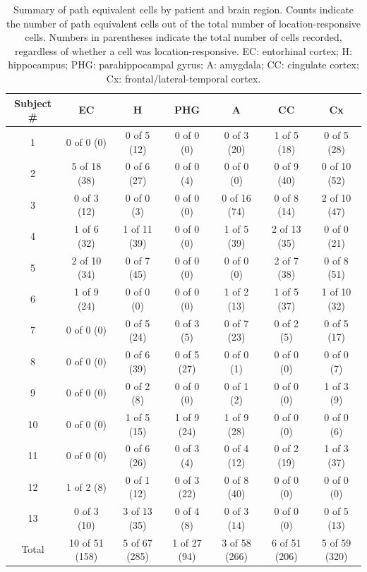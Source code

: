 \clearpage
\begin{table}
	\centering
	\small
\begin{tabular}{c|cccccc}
Subject \# & EC & H & PHG & A & CC & Cx\\\hline
1 &0 of 0 (0) &0 of 5 (12) &0 of 0 (0) &0 of 3 (20) &1 of 5 (18) &0 of 5 (28)\\
2 &5 of 18 (38) &0 of 6 (27) &0 of 0 (4) &0 of 0 (0) &0 of 9 (40) &0 of 10 (52)\\
3 &0 of 3 (12) &0 of 0 (3) &0 of 0 (0) &0 of 16 (74) &0 of 8 (14) &2 of 10 (47)\\
4 &1 of 6 (32) &1 of 11 (39) &0 of 0 (0) &1 of 5 (39) &2 of 13 (35) &0 of 0 (21)\\
5 &2 of 10 (34) &0 of 7 (45) &0 of 0 (0) &0 of 0 (0) &2 of 7 (38) &0 of 8 (51)\\
6 &1 of 9 (24) &0 of 0 (0) &0 of 0 (0) &1 of 2 (13) &1 of 5 (37) &1 of 10 (32)\\
7 &0 of 0 (0) &0 of 5 (24) &0 of 3 (5) &0 of 7 (23) &0 of 2 (5) &0 of 5 (17)\\
8 &0 of 0 (0) &0 of 6 (39) &0 of 5 (27) &0 of 0 (1) &0 of 0 (0) &0 of 0 (7)\\
9 &0 of 0 (0) &0 of 2 (8) &0 of 0 (0) &0 of 1 (2) &0 of 0 (0) &1 of 3 (9)\\
10 &0 of 0 (0) &1 of 5 (15) &1 of 9 (24) &1 of 9 (28) &0 of 0 (0) &0 of 0 (6)\\
11 &0 of 0 (0) &0 of 6 (26) &0 of 3 (4) &0 of 4 (12) &0 of 2 (19) &1 of 3 (37)\\
12 &1 of 2 (8) &0 of 1 (12) &0 of 3 (22) &0 of 8 (40) &0 of 0 (0) &0 of 0 (0)\\
13 &0 of 3 (10) &3 of 13 (35) &0 of 4 (8) &0 of 3 (14) &0 of 0 (0) &0 of 5 (13)\\
\hline Total &10 of 51 (158) &5 of 67 (285) &1 of 27 (94) &3 of 58 (266) &6 of 51 (206) &5 of 59 (320)\\
\end{tabular}
\caption[Summary of path equivalent cells]{Summary of path equivalent cells by patient and brain region. Counts indicate the number of path equivalent cells out of the total number of location-responsive cells. Numbers in parentheses indicate the total number of cells recorded, regardless of whether a cell was location-responsive. EC: entorhinal cortex; H: hippocampus; PHG: parahippocampal gyrus; A: amygdala; CC: cingulate cortex; Cx: frontal/lateral-temporal  cortex.}
\label{tab:countsCurrBio}
\end{table}


